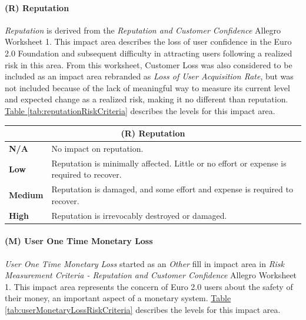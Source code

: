 \documentclass[12pt]{article} %
\newcommand{\hypertableref}[1]{\hyperref[#1]{Table \ref{#1}}}
\begin{document}
{\paragraph{(R) Reputation}

\textit{Reputation} is derived from the \textit{Reputation and Customer Confidence} Allegro Worksheet 1. This impact area describes the loss of user confidence in the Euro 2.0 Foundation and subsequent difficulty in attracting users following a realized risk in this area. From this worksheet, Customer Loss was also considered to be included as an impact area rebranded as \textit{Loss of User Acquisition Rate}, but was not included because of the lack of meaningful way to measure its current level and expected change as a realized risk, making it no different than reputation. \hypertableref{tab:reputationRiskCriteria} describes the levels for this impact area.

\begin{center}
\begin{tabular}{ | l | p{12cm} | }
  \hline
  \multicolumn{2}{|c|}{\textbf{(R) Reputation}}
  \\ \hline
  \textbf{N/A} & No impact on reputation.
  \\ \hline
  \textbf{Low} & Reputation is minimally affected. Little or no effort or expense is required to recover.
  \\ \hline
  \textbf{Medium} & Reputation is damaged, and some effort and expense is required to recover.
  \\ \hline
  \textbf{High} & Reputation is irrevocably destroyed or damaged.
  \\ \hline
\end{tabular}
\end{center}
\label{tab:reputationRiskCriteria}

\paragraph{(M) User One Time Monetary Loss}

\textit{User One Time Monetary Loss} started as an \textit{Other} fill in impact area in \textit{Risk Measurement Criteria - Reputation and Customer Confidence} Allegro Worksheet 1. This impact area represents the concern of Euro 2.0 users about the safety of their money, an important aspect of a monetary system. \hypertableref{tab:userMonetaryLossRiskCriteria} describes the levels for this impact area.

}
\end{document}
